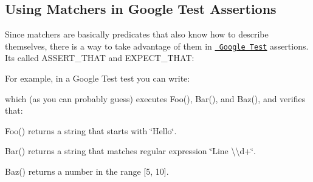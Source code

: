 \begin{DoxyCode}{0}
\end{DoxyCode}


\subsection*{Using Matchers in Google Test Assertions}

Since matchers are basically predicates that also know how to describe themselves, there is a way to take advantage of them in \href{http://code.google.com/p/googletest/}\texttt{ Google Test} assertions. It\textquotesingle{}s called {\ttfamily A\+S\+S\+E\+R\+T\+\_\+\+T\+H\+AT} and {\ttfamily E\+X\+P\+E\+C\+T\+\_\+\+T\+H\+AT}\+:


\begin{DoxyCode}{0}
\end{DoxyCode}


For example, in a Google Test test you can write\+:


\begin{DoxyCode}{0}
\DoxyCodeLine{}
\DoxyCodeLine{}
\end{DoxyCode}


which (as you can probably guess) executes {\ttfamily Foo()}, {\ttfamily Bar()}, and {\ttfamily Baz()}, and verifies that\+:


\begin{DoxyItemize}
\item {\ttfamily Foo()} returns a string that starts with {\ttfamily \char`\"{}\+Hello\char`\"{}}.
\item {\ttfamily Bar()} returns a string that matches regular expression {\ttfamily \char`\"{}\+Line \textbackslash{}\textbackslash{}d+\char`\"{}}.
\item {\ttfamily Baz()} returns a number in the range \mbox{[}5, 10\mbox{]}.
\end{DoxyItemize}

